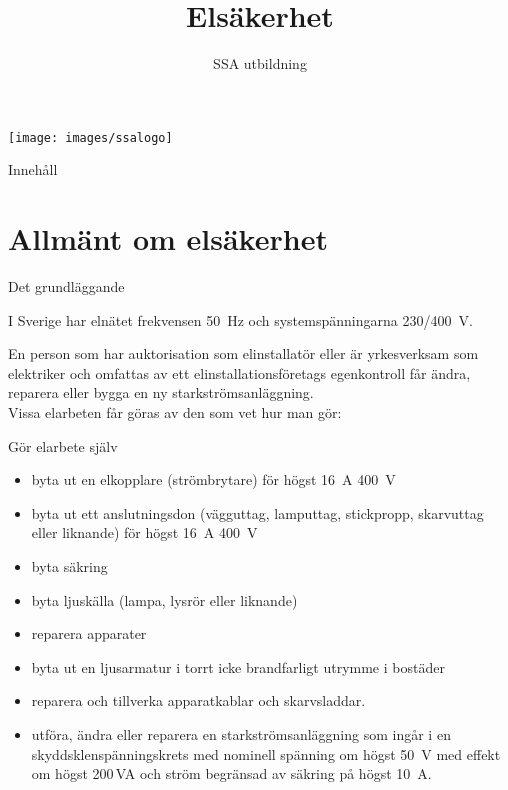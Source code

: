 \documentclass{beamer}
\title[SM7NTJ]{Elsäkerhet}
\author{SSA utbildning}
\begin{document}
	
	\begin{frame}
		\titlepage
		\texttt{[image: images/ssalogo]}
	\end{frame}

\begin{frame}{Innehåll}
\tableofcontents
\end{frame}

\section{Allmänt om elsäkerhet}

\begin{frame}{Det grundläggande}

I Sverige har elnätet frekvensen \qty{50}{\hertz} och systemspänningarna \qty{230/400}{\volt}.

En person som har auktorisation som elinstallatör eller är yrkesverksam som
elektriker och omfattas av ett elinstallationsföretags egenkontroll får ändra,
reparera eller bygga en ny starkströmsanläggning.\\
\vspace{5mm}
Vissa elarbeten får göras av den som vet hur man gör:
\end{frame}

\begin{frame}{Gör elarbete själv}
\begin{itemize}
	\item byta ut en elkopplare (strömbrytare) för högst \qty{16}{\ampere} \qty{400}{\volt}
	\item byta ut ett anslutningsdon (vägguttag, lamputtag, stickpropp,
	skarvuttag eller liknande) för högst \qty{16}{\ampere} \qty{400}{\volt}
	\item byta säkring
	\item byta ljuskälla (lampa, lysrör eller liknande)
	\item reparera apparater
	\item byta ut en ljusarmatur i torrt icke brandfarligt utrymme i bostäder
	\item reparera och tillverka apparatkablar och skarvsladdar.
	\item utföra, ändra eller reparera en starkströmsanläggning som ingår i en
	skyddsklenspänningskrets med nominell spänning om högst \qty{50}{\volt} med effekt
	om högst 200\,VA och ström begränsad av säkring på högst \qty{10}{\ampere}.
\end{itemize}
\end{frame}
\end{document}
